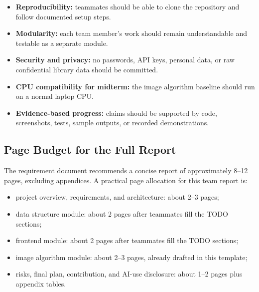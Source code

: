 \begin{itemize}
  \item \textbf{Reproducibility:} teammates should be able to clone the repository and follow documented setup steps.
  \item \textbf{Modularity:} each team member's work should remain understandable and testable as a separate module.
  \item \textbf{Security and privacy:} no passwords, API keys, personal data, or raw confidential library data should be committed.
  \item \textbf{CPU compatibility for midterm:} the image algorithm baseline should run on a normal laptop CPU.
  \item \textbf{Evidence-based progress:} claims should be supported by code, screenshots, tests, sample outputs, or recorded demonstrations.
\end{itemize}

\subsection{Page Budget for the Full Report}

The requirement document recommends a concise report of approximately 8--12 pages, excluding appendices. A practical page allocation for this team report is:

\begin{itemize}
  \item project overview, requirements, and architecture: about 2--3 pages;
  \item data structure module: about 2 pages after teammates fill the TODO sections;
  \item frontend module: about 2 pages after teammates fill the TODO sections;
  \item image algorithm module: about 2--3 pages, already drafted in this template;
  \item risks, final plan, contribution, and AI-use disclosure: about 1--2 pages plus appendix tables.
\end{itemize}

